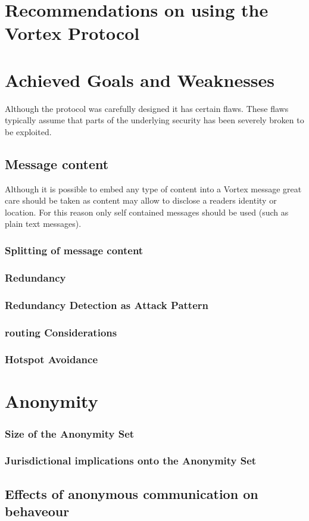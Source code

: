 \chapter{Recommendations on using the Vortex Protocol}

\chapter{Achieved Goals and Weaknesses}
Although the protocol was carefully designed it has certain flaws. These flaws typically assume that parts of the underlying security has been severely broken to be exploited.


\section{Message content}
Although it is possible to embed any type of content into a Vortex message great care should be taken as content may allow to disclose a readers identity or location. For this reason only self contained messages should be used (such as plain text messages).

\subsection{Splitting of message content}

\subsection{Redundancy}

\subsection{Redundancy Detection as Attack Pattern}

\subsection{routing Considerations}

\subsection{Hotspot Avoidance}


\chapter{Anonymity}

\subsection{Size of the Anonymity Set}

\subsection{Jurisdictional implications onto the Anonymity Set}

\section{Effects of anonymous communication on behaveour}


